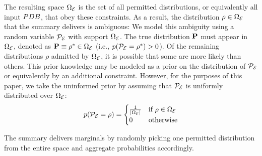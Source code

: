 The resulting space $\Omega_\mathcal E$ is the set of all permitted distributions, or equivalently all input $PDB$, that obey these constraints.
As a result, the distribution $\rho\in\Omega_\mathcal E$ that the summary delivers is ambiguous: We model this ambiguity using a random variable $\mathcal P_\mathcal E$ with support $\Omega_\mathcal E$.
The true distribution $\mathbf{P}$ must appear in $\Omega_\mathcal E$, denoted as $\mathbf{P}\equiv\rho^*\in\Omega_\mathcal E$ (i.e., $p(\mathcal P_\mathcal E = \rho^*) > 0$). 
Of the remaining distributions $\rho$ admitted by $\Omega_\mathcal E$, it is possible that some are more likely than others.
This prior knowledge may be modeled as a prior on the distribution of $\mathcal P_\mathcal E$ or equivalently by an additional constraint.
However, for the purposes of this paper, we take the uninformed prior by assuming that $\mathcal P_\mathcal E$ is uniformly distributed over $\Omega_\mathcal E$:
\begin{equation*}
\label{uniformprior}
p(\mathcal P_\mathcal E = \rho) = 
\begin{cases}
\frac{1}{|\Omega_\mathcal E|} & \text{if } \rho \in \Omega_\mathcal E\\
0 & \text{otherwise}
\end{cases}
\end{equation*}

The summary delivers marginals by randomly picking one permitted distribution from the entire space and aggregate probabilities accordingly.
